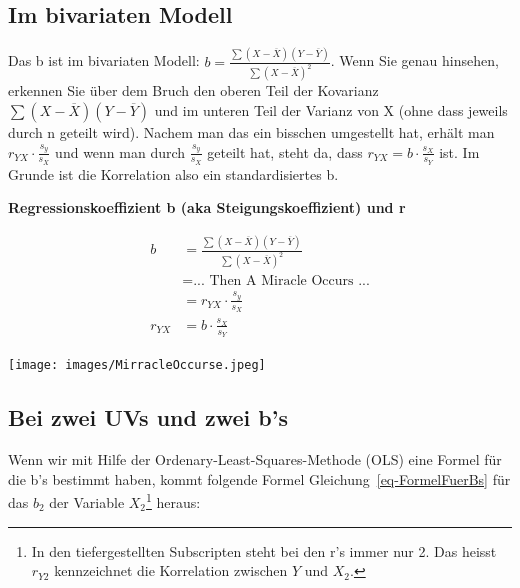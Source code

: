 \documentclass[
  10pt,
  letterpaper,
  a4paper, twoside]{scrreprt}
\begin{document}
\subsection{Im bivariaten Modell}\label{im-bivariaten-modell}

Das b ist im bivariaten Modell:
\(b = \frac{\sum{(X- \overline{X})(Y- \overline{Y})}}{\sum{(X- \overline{X})^2}}\).
Wenn Sie genau hinsehen, erkennen Sie über dem Bruch den oberen Teil der
Kovarianz \(\sum{(X- \overline{X})(Y- \overline{Y})}\) und im unteren
Teil der Varianz von X (ohne dass jeweils durch n geteilt wird). Nachem
man das ein bisschen umgestellt hat, erhält man
\(r_{YX}\cdot \frac{s_y}{s_X}\) und wenn man durch \(\frac{s_y}{s_X}\)
geteilt hat, steht da, dass \(r_{YX} = b \cdot \frac{s_X}{s_Y}\) ist. Im
Grunde ist die Korrelation also ein standardisiertes b.

\begin{tcolorbox}[enhanced jigsaw, bottomrule=.15mm, arc=.35mm, colframe=quarto-callout-note-color-frame, leftrule=.75mm, rightrule=.15mm, breakable, left=2mm, colback=white, toprule=.15mm, opacityback=0]

\vspace{-3mm}\textbf{Regressionskoeffizient b (aka Steigungskoeffizient) und r}\vspace{3mm}

\begin{align}
  b & = \frac{\sum{(X- \overline{X})(Y- \overline{Y})}}{\sum{(X- \overline{X})^2}} \\
 {} & = \text{... Then A Miracle Occurs ...}  \\
 {} & =r_{YX}\cdot \frac{s_y}{s_X} \\
 r_{YX} & = b \cdot \frac{s_X}{s_Y}
\end{align}

\texttt{[image: images/MirracleOccurse.jpeg]}

\end{tcolorbox}

\subsection{Bei zwei UVs und zwei b's}\label{bei-zwei-uvs-und-zwei-bs}

Wenn wir mit Hilfe der Ordenary-Least-Squares-Methode (OLS) eine Formel
für die b's bestimmt haben, kommt folgende Formel
Gleichung~\ref{eq-FormelFuerBs} für das \(b_2\) der Variable
\(X_2\)\footnote{In den tiefergestellten Subscripten steht bei den r's
  immer nur 2. Das heisst \(r_{Y2}\) kennzeichnet die Korrelation
  zwischen \(Y\) und \(X_2\).} heraus:
\end{document}
